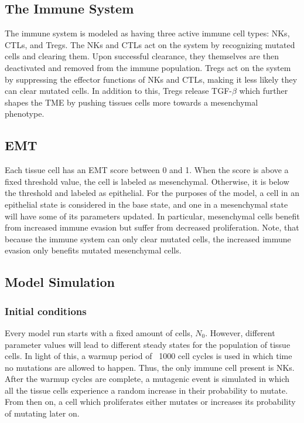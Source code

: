 \documentclass[11pt, preprint]{article}
\begin{document}

\subsection{The Immune System}\label{ImmuneSystem}
The immune system is modeled as having three active immune cell types: NKs, CTLs, and Tregs.
The NKs and CTLs act on the system by recognizing mutated cells and clearing them.
Upon successful clearance, they themselves are then deactivated and removed from the immune population.
Tregs act on the system by suppressing the effector functions of NKs and CTLs, making it less likely they can clear mutated cells.
In addition to this, Tregs release TGF-$\beta$ which further shapes the TME by pushing tissues cells more towards a mesenchymal phenotype.

\subsection{EMT}\label{EMT}
Each tissue cell has an EMT score between 0 and 1.
When the score is above a fixed threshold value, the cell is labeled as mesenchymal.
Otherwise, it is below the threshold and labeled as epithelial.
For the purposes of the model, a cell in an epithelial state is considered in the base state, and one in a mesenchymal state will have some of its parameters updated.
In particular, mesenchymal cells benefit from increased immune evasion but suffer from decreased proliferation.
Note, that because the immune system can only clear mutated cells, the increased immune evasion only benefits mutated mesenchymal cells.

\subsection{Model Simulation}

\subsubsection{Initial conditions} Every model run starts with a fixed amount of cells, $N_0$.
However, different parameter values will lead to different steady states for the population of tissue cells.
In light of this, a warmup period of ~1000 cell cycles is used in which time no mutations are allowed to happen.
Thus, the only immune cell present is NKs.
After the warmup cycles are complete, a mutagenic event is simulated in which all the tissue cells experience a random increase in their probability to mutate.
From then on, a cell which proliferates either mutates or increases its probability of mutating later on.
\end{document}
